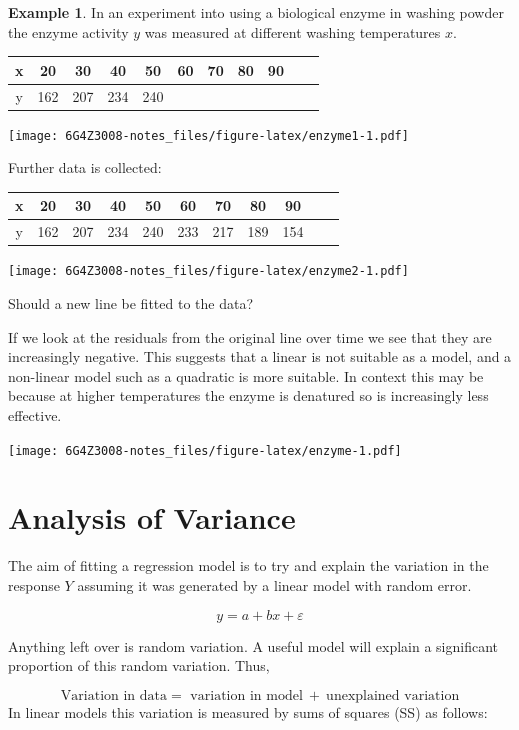 \documentclass[
]{book}
\theoremstyle{definition}
\theoremstyle{definition}
\newtheorem{example}{Example}[chapter]
\theoremstyle{definition}
\theoremstyle{definition}
\theoremstyle{remark}
\begin{document}
\begin{example}
In an experiment into using a biological enzyme in washing powder the enzyme activity \(y\) was measured at different washing temperatures \(x\).

\begin{longtable}[]{@{}ccccccccccc@{}}
\toprule
x & 20 & 30 & 40 & 50 & 60 & 70 & 80 & 90 & &\tabularnewline
\midrule
\endhead
y & 162 & 207 & 234 & 240 & & & & & &\tabularnewline
\bottomrule
\end{longtable}

\texttt{[image: 6G4Z3008-notes\_files/figure-latex/enzyme1-1.pdf]}

Further data is collected:

\begin{longtable}[]{@{}ccccccccccc@{}}
\toprule
x & 20 & 30 & 40 & 50 & 60 & 70 & 80 & 90 & &\tabularnewline
\midrule
\endhead
y & 162 & 207 & 234 & 240 & 233 & 217 & 189 & 154 & &\tabularnewline
\bottomrule
\end{longtable}

\texttt{[image: 6G4Z3008-notes\_files/figure-latex/enzyme2-1.pdf]}

Should a new line be fitted to the data?
\end{example}

If we look at the residuals from the original line over time we see that they are increasingly negative. This suggests that a linear is not suitable as a model, and a non-linear model such as a quadratic is more suitable. In context this may be because at higher temperatures the enzyme is denatured so is increasingly less effective.

\texttt{[image: 6G4Z3008-notes\_files/figure-latex/enzyme-1.pdf]}

\hypertarget{analysis-of-variance}{%
\section{Analysis of Variance}\label{analysis-of-variance}}

The aim of fitting a regression model is to try and explain the variation in the response \(Y\) assuming it was generated by a linear model with random error.

\[y= a+bx+\varepsilon\]

Anything left over is random variation. A useful model will explain a significant proportion of this random variation. Thus,

\[\text{Variation in data} = \text{ variation in model} \  + \ \text{unexplained variation}\]
In linear models this variation is measured by sums of squares (SS) as follows:
\end{document}
